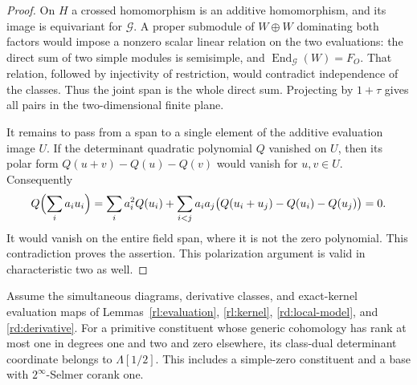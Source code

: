\begin{proof}
On \(H\) a crossed homomorphism is an additive homomorphism, and its
image is equivariant for \(\mathcal G\).  A proper submodule of
\(W\oplus W\) dominating both factors would impose a nonzero
scalar linear relation on the two evaluations: the direct sum of
two simple modules is semisimple, and
\(\operatorname{End}_{\mathcal G}(W)=F_O\).
That relation, followed by injectivity of restriction, would
contradict independence of the classes.  Thus the joint span is
the whole direct sum.  Projecting by \(1+\tau\) gives all pairs
in the two-dimensional finite plane.

It remains to pass from a span to a single element of the additive
evaluation image \(U\).  If the determinant quadratic polynomial
\(Q\) vanished on \(U\), then its polar form
\(Q(u+v)-Q(u)-Q(v)\) would vanish for \(u,v\in U\).
Consequently
\[
 Q\Bigl(\sum_i a_i u_i\Bigr)
 =\sum_i a_i^2 Q(u_i)
  +\sum_{i<j}a_i a_j
       \bigl(Q(u_i+u_j)-Q(u_i)-Q(u_j)\bigr)
 =0.
 \]
It would vanish on the entire field span, where it is not the zero
polynomial.  This contradiction proves the assertion.  This
polarization argument is valid in characteristic two as well.
\end{proof}

\begin{proposition}
\label{rd:away-two}
Assume the simultaneous diagrams, derivative classes, and exact-kernel
evaluation maps of Lemmas~\ref{rl:evaluation}, \ref{rl:kernel},
\ref{rd:local-model}, and \ref{rd:derivative}.  For a primitive
constituent whose generic cohomology has rank at most one in degrees
one and two and zero elsewhere, its class-dual determinant
coordinate belongs to \(\Lambda[1/2]\).
This includes a simple-zero constituent and a base with
\(2^\infty\)-Selmer corank one.
\end{proposition}

